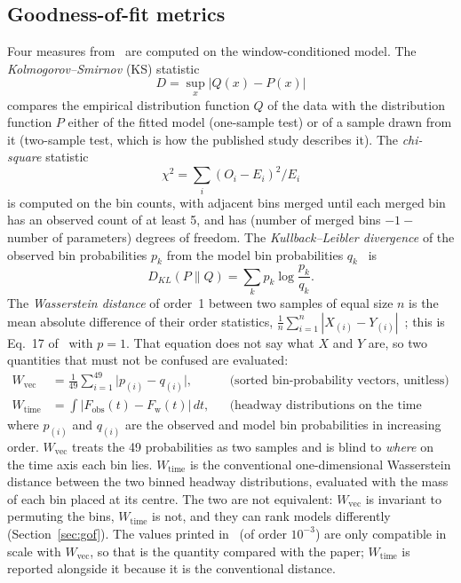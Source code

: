 \documentclass[11pt,a4paper]{article}
\numberwithin{equation}{section}
\newcommand{\Wvec}{W_{\mathrm{vec}}}
\newcommand{\Wtime}{W_{\mathrm{time}}}
\begin{document}
\subsection{Goodness-of-fit metrics}\label{sec:metrics}
Four measures from~\cite{leungbootnak} are computed on the window-conditioned model.
The \emph{Kolmogorov--Smirnov} (KS) statistic~\cite{massey1951}
\begin{equation}\label{eq:ks}
D=\sup_x|Q(x)-P(x)|
\end{equation}
compares the empirical distribution function $Q$ of the data with the distribution function $P$ either of the fitted model (one-sample test) or of a sample drawn from it (two-sample test, which is how the published study describes it).
The \emph{chi-square} statistic~\cite{pearson1900}
\begin{equation}\label{eq:chi}
\chi^2=\sum_i(O_i-E_i)^2/E_i
\end{equation}
is computed on the bin counts, with adjacent bins merged until each merged bin has an observed count of at least 5, and has (number of merged bins $-1-$ number of parameters) degrees of freedom.
The \emph{Kullback--Leibler divergence} of the observed bin probabilities $p_k$ from the model bin probabilities $q_k$~\cite{kullback1951} is
\begin{equation}\label{eq:kl}
D_{KL}(P\|Q)=\sum_k p_k\log\frac{p_k}{q_k}.
\end{equation}
The \emph{Wasserstein distance} of order~1 between two samples of equal size $n$ is the mean absolute difference of their order statistics,
$\frac1n\sum_{i=1}^n|X_{(i)}-Y_{(i)}|$~\cite{vallender1974}; this is Eq.~17 of~\cite{leungbootnak} with $p=1$. That equation does not say what $X$ and $Y$ are, so two quantities that must not be confused are evaluated:
\begin{align}
\Wvec&=\frac1{49}\sum_{i=1}^{49}\big|p_{(i)}-q_{(i)}\big|, &&\text{(sorted bin-probability vectors, unitless)}\label{eq:wvec}\\
\Wtime&=\int\big|F_{\mathrm{obs}}(t)-F_{\mathrm w}(t)\big|\,dt, &&\text{(headway distributions on the time axis, seconds)}\label{eq:wtime}
\end{align}
where $p_{(i)}$ and $q_{(i)}$ are the observed and model bin probabilities in increasing order. $\Wvec$ treats the 49 probabilities as two samples and
is blind to \emph{where} on the time axis each bin lies. $\Wtime$ is the conventional one-dimensional Wasserstein distance
between the two binned headway distributions, evaluated with the mass of each bin placed at its centre. The two are not equivalent: $\Wvec$ is invariant to permuting the bins, $\Wtime$ is not,
and they can rank models differently (Section~\ref{sec:gof}). The values printed in~\cite{leungbootnak} (of order $10^{-3}$) are only compatible in scale with $\Wvec$, so that is the quantity compared with the paper;
$\Wtime$ is reported alongside it because it is the conventional distance.
\end{document}
